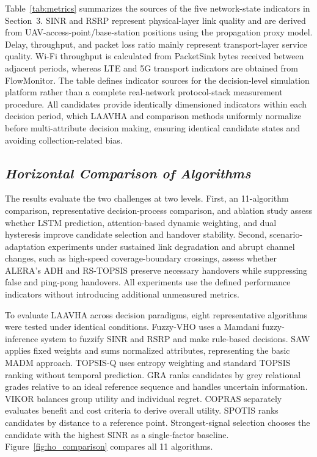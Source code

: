 \documentclass[10pt,a4paper]{article}
\begin{document}
Table~\ref{tab:metrics} summarizes the sources of the five network-state indicators in Section~3. SINR and RSRP represent physical-layer link quality and are derived from UAV-access-point/base-station positions using the propagation proxy model. Delay, throughput, and packet loss ratio mainly represent transport-layer service quality. Wi-Fi throughput is calculated from PacketSink bytes received between adjacent periods, whereas LTE and 5G transport indicators are obtained from FlowMonitor. The table defines indicator sources for the decision-level simulation platform rather than a complete real-network protocol-stack measurement procedure. All candidates provide identically dimensioned indicators within each decision period, which LAAVHA and comparison methods uniformly normalize before multi-attribute decision making, ensuring identical candidate states and avoiding collection-related bias.

\subsection{\textit{Horizontal Comparison of Algorithms}}

The results evaluate the two challenges at two levels. First, an 11-algorithm comparison, representative decision-process comparison, and ablation study assess whether LSTM prediction, attention-based dynamic weighting, and dual hysteresis improve candidate selection and handover stability. Second, scenario-adaptation experiments under sustained link degradation and abrupt channel changes, such as high-speed coverage-boundary crossings, assess whether ALERA's ADH and RS-TOPSIS preserve necessary handovers while suppressing false and ping-pong handovers. All experiments use the defined performance indicators without introducing additional unmeasured metrics.

To evaluate LAAVHA across decision paradigms, eight representative algorithms were tested under identical conditions. Fuzzy-VHO uses a Mamdani fuzzy-inference system to fuzzify SINR and RSRP and make rule-based decisions. SAW applies fixed weights and sums normalized attributes, representing the basic MADM approach. TOPSIS-Q uses entropy weighting and standard TOPSIS ranking without temporal prediction. GRA ranks candidates by grey relational grades relative to an ideal reference sequence and handles uncertain information. VIKOR balances group utility and individual regret. COPRAS separately evaluates benefit and cost criteria to derive overall utility. SPOTIS ranks candidates by distance to a reference point. Strongest-signal selection chooses the candidate with the highest SINR as a single-factor baseline. Figure~\ref{fig:ho_comparison} compares all 11 algorithms.
\end{document}
